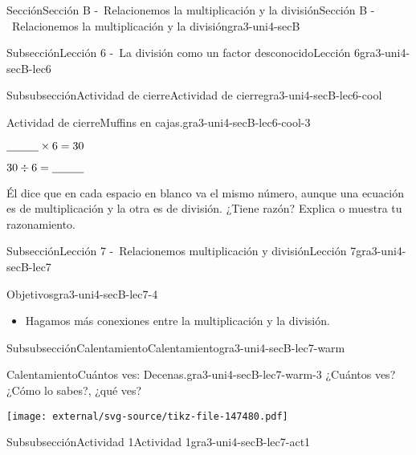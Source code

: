 \documentclass[twoside,10pt,]{article}
\begin{document}
\begin{sectionptx}{Sección}{Sección B -~Relacionemos la multiplicación y la división}{}{Sección B -~Relacionemos la multiplicación y la división}{}{}{gra3-uni4-secB}
\begin{subsectionptx}{Subsección}{Lección 6 -~La división como un factor desconocido}{}{Lección 6}{}{}{gra3-uni4-secB-lec6}
\begin{subsubsectionptx}{Subsubsección}{Actividad de cierre}{}{Actividad de cierre}{}{}{gra3-uni4-secB-lec6-cool}
\begin{project}{Actividad de cierre}{Muffins en cajas.}{gra3-uni4-secB-lec6-cool-3}
\begin{sidebyside}{2}{0.05}{0.05}{0.1}
\begin{sbspanel}{0.4}
\end{sbspanel}%
\begin{sbspanel}{0.4}%
\(\underline{\hspace{1 cm}} \times 6 = 30\)%
\par
\(30 \div 6 = \underline{\hspace{1 cm}}\)%
\end{sbspanel}%
\end{sidebyside}%
\par
Él dice que en cada espacio en blanco va el mismo número, aunque una ecuación es de multiplicación y la otra es de división. ¿Tiene razón? Explica o muestra tu razonamiento.%
\end{project}%
\end{subsubsectionptx}
\end{subsectionptx}
%
%
\typeout{************************************************}
\typeout{************************************************}
%
\begin{subsectionptx}{Subsección}{Lección 7 -~Relacionemos multiplicación y división}{}{Lección 7}{}{}{gra3-uni4-secB-lec7}
\begin{objectives}{Objetivos}{gra3-uni4-secB-lec7-4}
%
\begin{itemize}[label=\textbullet]
\item{}Hagamos más conexiones entre la multiplicación y la división.%
\end{itemize}
\end{objectives}
%
%
\typeout{************************************************}
\typeout{************************************************}
%
\begin{subsubsectionptx}{Subsubsección}{Calentamiento}{}{Calentamiento}{}{}{gra3-uni4-secB-lec7-warm}
\begin{exploration}{Calentamiento}{Cuántos ves: Decenas.}{gra3-uni4-secB-lec7-warm-3}%
¿Cuántos ves? ¿Cómo lo sabes?, ¿qué ves?%
\begin{image}{0}{1}{0}{}%
\texttt{[image: external/svg-source/tikz-file-147480.pdf]}
\end{image}%
\end{exploration}%
\end{subsubsectionptx}
%
%
\typeout{************************************************}
\typeout{************************************************}
%
\begin{subsubsectionptx}{Subsubsección}{Actividad 1}{}{Actividad 1}{}{}{gra3-uni4-secB-lec7-act1}

\end{subsubsectionptx}
\end{subsectionptx}
\end{sectionptx}
\end{document}
